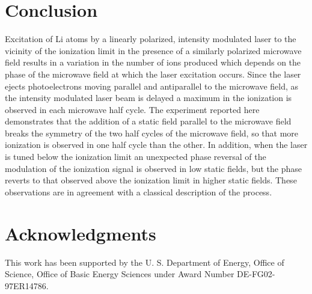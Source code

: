 \documentclass[aps,pra,reprint,groupedaddress]{revtex4-1}
\begin{document}
\section{\label{sec:conc} Conclusion}

Excitation of Li atoms by a linearly polarized, intensity modulated laser to the vicinity of the ionization limit in the presence of a similarly polarized microwave field results in a variation in the number of ions produced which depends on the phase of the microwave field at which the laser excitation occurs. Since the laser ejects photoelectrons moving parallel and antiparallel to the microwave field, as the intensity modulated laser beam is delayed a maximum in the ionization is observed in each microwave half cycle. The experiment reported here demonstrates that the addition of a static field parallel to the microwave field breaks the symmetry of the two half cycles of the microwave field, so that more ionization is observed in one half cycle than the other. In addition, when the laser is tuned below the ionization limit an unexpected phase reversal of the modulation of the ionization signal is observed in low static fields, but the phase reverts to that observed above the ionization limit in higher static fields. These observations are in agreement with a classical description of the process.

\section{\label{sec:ack} Acknowledgments}

This work has been supported by the U. S. Department of Energy, Office of Science, Office of Basic Energy Sciences under Award Number DE-FG02-97ER14786.


\end{document}
